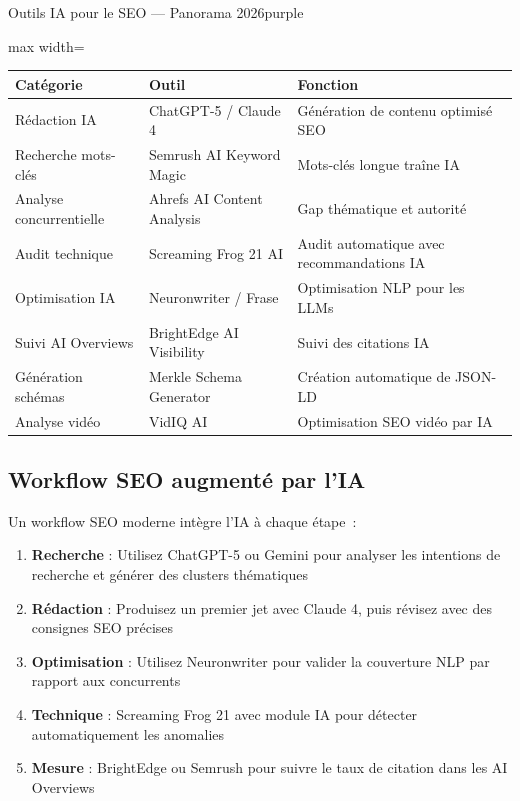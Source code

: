 \documentclass[12pt,a4paper,twoside]{report}
\begin{document}
\begin{mybox}{Outils IA pour le SEO — Panorama 2026}{purple}
\begin{adjustbox}{max width=\textwidth}
\begin{tabular}{lll}
    \toprule
    \textbf{Catégorie} & \textbf{Outil} & \textbf{Fonction} \\
    \midrule
    Rédaction IA & ChatGPT-5 / Claude 4 & Génération de contenu optimisé SEO \\
    Recherche mots-clés & Semrush AI Keyword Magic & Mots-clés longue traîne IA \\
    Analyse concurrentielle & Ahrefs AI Content Analysis & Gap thématique et autorité \\
    Audit technique & Screaming Frog 21 AI & Audit automatique avec recommandations IA \\
    Optimisation IA & Neuronwriter / Frase & Optimisation NLP pour les LLMs \\
    Suivi AI Overviews & BrightEdge AI Visibility & Suivi des citations IA \\
    Génération schémas & Merkle Schema Generator & Création automatique de JSON-LD \\
    Analyse vidéo & VidIQ AI & Optimisation SEO vidéo par IA \\
    \bottomrule
\end{tabular}
\end{adjustbox}
\end{mybox}

\subsection{Workflow SEO augmenté par l'IA}

Un workflow SEO moderne intègre l'IA à chaque étape~:

\begin{enumerate}
    \item \textbf{Recherche} : Utilisez ChatGPT-5 ou Gemini pour analyser les intentions de recherche et générer des clusters thématiques
    \item \textbf{Rédaction} : Produisez un premier jet avec Claude 4, puis révisez avec des consignes SEO précises
    \item \textbf{Optimisation} : Utilisez Neuronwriter pour valider la couverture NLP par rapport aux concurrents
    \item \textbf{Technique} : Screaming Frog 21 avec module IA pour détecter automatiquement les anomalies
    \item \textbf{Mesure} : BrightEdge ou Semrush pour suivre le taux de citation dans les AI Overviews
\end{enumerate}
\end{document}

